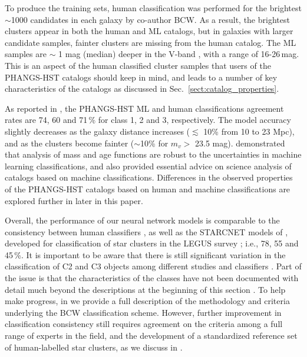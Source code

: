 \documentclass[linenumbers]{aastex63}
\begin{document}
To produce the training sets, human classification was performed for the brightest $\sim$1000 candidates 
in each galaxy by co-author BCW. As a result, the brightest clusters appear in both the human and ML catalogs, but in galaxies with larger candidate samples, fainter clusters are missing from the human catalog.  The ML samples are $\sim$ 1 mag (median) deeper in the V-band \citep[and Section~\ref{ssect:v_mag}]{whitmore_star_2021}, with a range of 16-26\,mag. This is an aspect of the human classified cluster samples that users of the PHANGS-HST catalogs should keep in mind, and leads to a number of key characteristics of the catalogs as discussed in Sec.~\ref{sect:catalog_properties}.   

As reported in \citet{hannon_star_2023}, the PHANGS-HST ML and human classifications agreement rates are 74, 60 and 71\,\% for class 1, 2 and 3, respectively.  
The model accuracy slightly decreases as the galaxy distance increases ($\lesssim$ 10\% from 10 to 23 Mpc), and as the clusters become fainter ($\sim$10\% for $m_v>$ 23.5 mag). \citet{whitmore_star_2021} demonstrated that analysis of mass and age functions are robust to the uncertainties in machine learning classifications, and also provided essential advice on science analysis of catalogs based on machine classifications.  Differences in the observed properties of the PHANGS-HST catalogs based on human and machine classifications are explored further in later in this paper.

Overall, the performance of our neural network models is comparable to the consistency between human classifiers \citep{wei_deep_2020, whitmore_star_2021}, as well as the \textsc{STARCNET} models of \citet{perez_starcnet_2021}, developed for classification of star clusters in the LEGUS survey \citep{calzetti_legacy_2015, linden_star_2022}; i.e., 78, 55 and 45\,\%.    {It is important to be aware that there is still significant variation in the classification of C2 and C3 objects among different studies and classifiers \citep[e.g., discussion in section 6.3.3 of][]{whitmore_star_2021}.  Part of the issue is that the characteristics of the classes have not been documented with detail much beyond the descriptions at the beginning of this section \citep[e.g., see section 2 in both][]{adamo_legacy_2017, perez_starcnet_2021}.  To help make progress, in \citet{whitmore_star_2021} we provide a full description of the methodology and criteria underlying the BCW classification scheme.  However, further improvement in classification consistency still requires agreement on the criteria among a full range of experts in the field, and the development of a standardized reference set of human-labelled star clusters, as we discuss in \citet{wei_deep_2020}.}   
\end{document}
